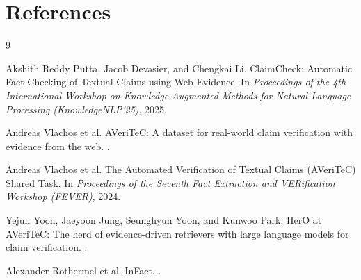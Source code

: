 \documentclass[11pt]{article}
\begin{document}
\section*{References}
\begin{thebibliography}{9}

Akshith Reddy Putta, Jacob Devasier, and Chengkai Li.
\newblock ClaimCheck: Automatic Fact-Checking of Textual Claims using Web Evidence.
\newblock In \textit{Proceedings of the 4th International Workshop on Knowledge-Augmented Methods for Natural Language Processing (KnowledgeNLP'25)}, 2025.

Andreas Vlachos et al.
\newblock AVeriTeC: A dataset for real-world claim verification with evidence from the web.
.

Andreas Vlachos et al.
\newblock The Automated Verification of Textual Claims (AVeriTeC) Shared Task.
\newblock In \textit{Proceedings of the Seventh Fact Extraction and VERification Workshop (FEVER)}, 2024.

Yejun Yoon, Jaeyoon Jung, Seunghyun Yoon, and Kunwoo Park.
\newblock HerO at AVeriTeC: The herd of evidence-driven retrievers with large language models for claim verification.
.

Alexander Rothermel et al.
\newblock InFact.
.

\end{thebibliography}
\end{document}
